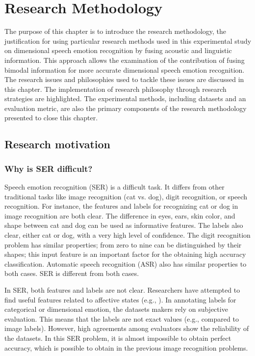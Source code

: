 \chapter{Research Methodology}

The purpose of this chapter is to introduce the research methodology, the
justification for using particular research methods used in this experimental
study on dimensional speech emotion recognition by fusing acoustic and
linguistic information. This approach allows the examination of the
contribution of fusing bimodal information for more accurate dimensional speech
emotion recognition. The research issues and philosophies used to tackle these
issues are discussed in this chapter. The implementation of research philosophy
through research strategies are highlighted. The experimental methods,
including datasets and an evaluation metric, are also the primary components of
the research methodology presented to close this chapter.

\section{Research motivation}
\subsection{Why is SER difficult?}
Speech emotion recognition (SER) is a difficult task. It differs from other
traditional tasks like image recognition (cat vs. dog), digit recognition, or
speech recognition. For instance, the features and labels for recognizing cat
or dog in image recognition are both clear. The difference in eyes, ears, skin
color, and shape between cat and dog can be used as informative features. The
labels also clear, either cat or dog, with a very high level of confidence. The
digit recognition problem has similar properties; from zero to nine can be
distinguished by their shapes; this input feature is an important factor for
the obtaining high accuracy classification.  Automatic speech recognition (ASR)
also has similar properties to both cases. SER is different from both cases.   

In SER, both features and labels are not clear. Researchers have attempted to
find useful features related to affective states (e.g.,
\cite{Batliner2011,Mairano}). In annotating labels for categorical or
dimensional emotion, the datasets makers rely on subjective evaluation. This
means that the labels are not exact values (e.g., compared to image labels).
However, high agreements among evaluators show the reliability of the datasets.
In this SER problem, it is almost impossible to obtain perfect accuracy, which
is possible to obtain in the previous image recognition problems.

